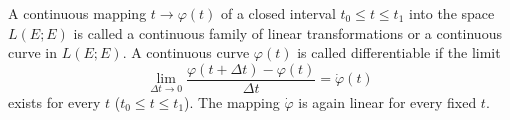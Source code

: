 A continuous mapping $t \rightarrow \varphi(t)$ of a closed interval $t_0 \leq t \leq t_1$ into the space $L(E; E)$ is called a continuous family of linear transformations or a continuous curve in $L(E; E)$. A continuous curve $\varphi(t)$ is called differentiable if the limit
$$\lim_{\Delta t \rightarrow 0} \frac{\varphi(t + \Delta t) - \varphi(t)}{\Delta t} = \dot{\varphi}(t)$$
exists for every $t$ ($t_0 \leq t \leq t_1$). The mapping $\dot{\varphi}$ is again linear for every fixed $t$.

